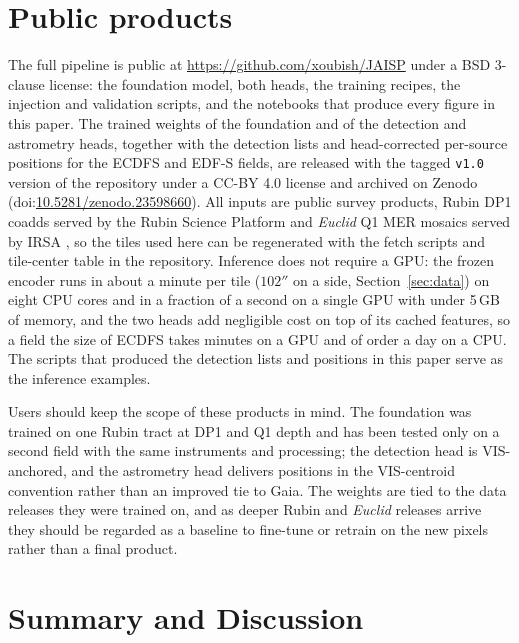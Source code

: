 \documentclass[twocolumn,linenumbers]{aastex701}
\begin{document}
\section{Public products}\label{sec:release}

The full pipeline is public at \url{https://github.com/xoubish/JAISP} under a BSD 3-clause license: the foundation model, both heads, the training recipes, the injection and validation scripts, and the notebooks that produce every figure in this paper. The trained weights of the foundation and of the detection and astrometry heads, together with the detection lists and head-corrected per-source positions for the ECDFS and EDF-S fields, are released with the tagged \texttt{v1.0} version of the repository under a CC-BY 4.0 license and archived on Zenodo (doi:\href{https://doi.org/10.5281/zenodo.23598660}{10.5281/zenodo.23598660}). All inputs are public survey products, Rubin DP1 coadds served by the Rubin Science Platform and \textit{Euclid} Q1 MER mosaics served by IRSA \citep{IRSA601}, so the tiles used here can be regenerated with the fetch scripts and tile-center table in the repository. Inference does not require a GPU: the frozen encoder runs in about a minute per tile ($102''$ on a side, Section~\ref{sec:data}) on eight CPU cores and in a fraction of a second on a single GPU with under 5\,GB of memory, and the two heads add negligible cost on top of its cached features, so a field the size of ECDFS takes minutes on a GPU and of order a day on a CPU. The scripts that produced the detection lists and positions in this paper serve as the inference examples.

Users should keep the scope of these products in mind. The foundation was trained on one Rubin tract at DP1 and Q1 depth and has been tested only on a second field with the same instruments and processing; the detection head is VIS-anchored, and the astrometry head delivers positions in the VIS-centroid convention rather than an improved tie to Gaia. The weights are tied to the data releases they were trained on, and as deeper Rubin and \textit{Euclid} releases arrive they should be regarded as a baseline to fine-tune or retrain on the new pixels rather than a final product.

\section{Summary and Discussion}\label{sec:discussion}
\end{document}
